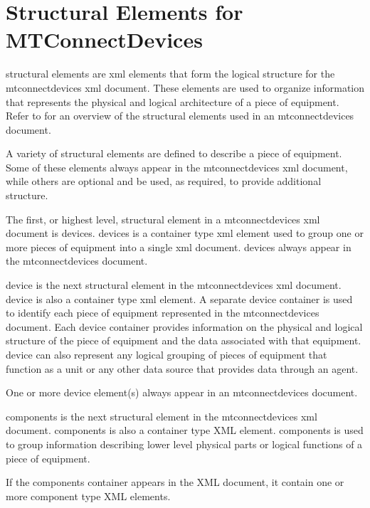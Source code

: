 \documentclass{mtconnect}	%
\begin{document}
\section{Structural Elements for MTConnectDevices}
\label{sec:Structural Elements for MTConnectDevices}
\lstset{numbers=left,xleftmargin=2em}

\glspl{structural element} are \gls{xml} elements that form the logical structure for the \gls{mtconnectdevices} \gls{xml} document.  These elements are used to organize information that represents the physical and logical architecture of a piece of equipment.  Refer to  for an overview of the \glspl{structural element} used in an \gls{mtconnectdevices} document.

A variety of \glspl{structural element} are defined to describe a piece of equipment.  Some of these elements \MUST always appear in the \gls{mtconnectdevices} \gls{xml} document, while others are optional and \may be used, as required, to provide additional structure.

The first, or highest level, \gls{structural element} in a \gls{mtconnectdevices} \gls{xml} document is \gls{devices}. \gls{devices} is a container type \gls{xml} element used to group one or more pieces of equipment into a single \gls{xml} document.  \gls{devices} \MUST always appear in the \gls{mtconnectdevices} document.

\gls{device} is the next \gls{structural element} in the \gls{mtconnectdevices} \gls{xml} document. \gls{device} is also a container type \gls{xml} element. A separate \gls{device} container is used to identify each piece of equipment represented in the \gls{mtconnectdevices} document. Each \gls{device} container provides information on the physical and logical structure of the piece of equipment and the data associated with that equipment. \gls{device} can also represent any logical grouping of pieces of equipment that function as a unit or any other data source that provides data through an \gls{agent}.

One or more \gls{device} element(s) \MUST always appear in an \gls{mtconnectdevices} document.

\gls{components} is the next \gls{structural element} in the \gls{mtconnectdevices} \gls{xml} document. \gls{components} is also a container type XML element. \gls{components} is used to group information describing \gls{lower level} physical parts or logical functions of a piece of equipment.

If the \gls{components} container appears in the XML document, it \MUST contain one or more \gls{component} type XML elements.
\end{document}
